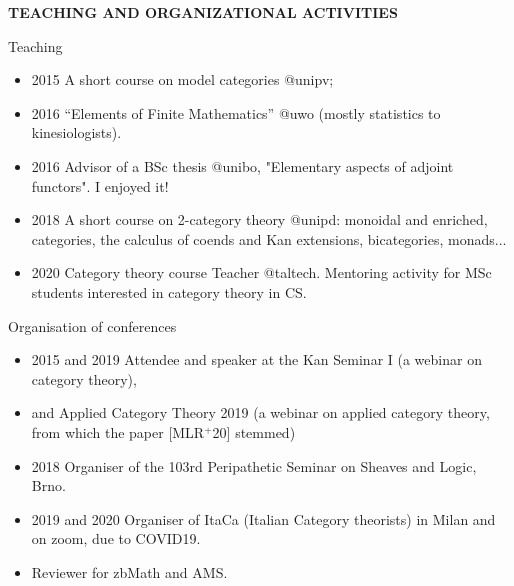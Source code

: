 \documentclass{beamer}
\begin{document}
%
%
%
%
%
\begin{frame}
  \Huge\centering \bfseries TEACHING AND ORGANIZATIONAL ACTIVITIES
\end{frame}
%
\begin{frame}{Teaching}\small
  \begin{itemize}
    \item<+-> 2015 A short course on \alert{model categories} {\color{magenta} @unipv};
    \item<+-> 2016 ``\alert{Elements of Finite Mathematics}'' {\color{magenta} @uwo} (mostly statistics to kinesiologists).
    \item<+-> 2016 \alert{Advisor} of a BSc thesis {\color{magenta} @unibo}, "Elementary aspects of adjoint functors". I enjoyed it!
    \item<+-> 2018 A short course on \alert{2-category theory} {\color{magenta} @unipd}: monoidal and enriched, categories, the calculus of coends and Kan extensions, bicategories, monads...
    \item<+-> 2020 \alert{Category theory} course Teacher {\color{magenta} @taltech}. Mentoring activity for MSc students interested in category theory in CS.
\end{itemize}
\end{frame}
\begin{frame}{Organisation of conferences}\small
  \begin{itemize}
    \item<+-> 2015 and 2019 Attendee and speaker at the \alert{Kan Seminar I} (a webinar on category theory),
    \item<+-> and \alert{Applied Category Theory} 2019 (a webinar on applied category theory, from which the paper [\alert{MLR$^{+}$20}] stemmed)
    \item<+-> 2018 \alert{Organiser} of the 103rd Peripathetic Seminar on Sheaves and Logic, Brno.
    \item<+-> 2019 and 2020 \alert{Organiser} of ItaCa (\alert{Ita}lian \alert{Ca}tegory theorists) in Milan and on zoom, due to COVID19.
    \item<+-> Reviewer for zbMath and AMS.
  \end{itemize}
\end{frame}
%
%
%
%
%
%
%
\end{document}
